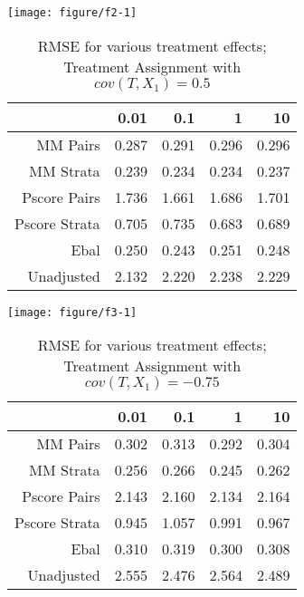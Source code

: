 \documentclass[11pt]{article}\usepackage[]{graphicx}\usepackage[]{color}
\makeatletter
\def\maxwidth{ %
  \ifdim\Gin@nat@width>\linewidth
    \linewidth
  \else
    \Gin@nat@width
  \fi
}
\newenvironment{knitrout}{}{} %
\makeatother
\begin{document}
\begin{knitrout}
\color{fgcolor}

{\centering \texttt{[image: figure/f2-1]} 

}



\end{knitrout}
\begin{table}[ht]
\centering
\begin{tabular}{rrrrr}
  \hline
 & 0.01 & 0.1 & 1 & 10 \\ 
  \hline
MM Pairs & 0.287 & 0.291 & 0.296 & 0.296 \\ 
  MM Strata & 0.239 & 0.234 & 0.234 & 0.237 \\ 
  Pscore Pairs & 1.736 & 1.661 & 1.686 & 1.701 \\ 
  Pscore Strata & 0.705 & 0.735 & 0.683 & 0.689 \\ 
  Ebal & 0.250 & 0.243 & 0.251 & 0.248 \\ 
  Unadjusted & 2.132 & 2.220 & 2.238 & 2.229 \\ 
   \hline
\end{tabular}
\caption{RMSE for various treatment effects; Treatment Assignment with $cov(T, X_1) = 0.5$} 
\label{tab:f2}
\end{table}



\begin{knitrout}
\color{fgcolor}

{\centering \texttt{[image: figure/f3-1]} 

}



\end{knitrout}
\begin{table}[ht]
\centering
\begin{tabular}{rrrrr}
  \hline
 & 0.01 & 0.1 & 1 & 10 \\ 
  \hline
MM Pairs & 0.302 & 0.313 & 0.292 & 0.304 \\ 
  MM Strata & 0.256 & 0.266 & 0.245 & 0.262 \\ 
  Pscore Pairs & 2.143 & 2.160 & 2.134 & 2.164 \\ 
  Pscore Strata & 0.945 & 1.057 & 0.991 & 0.967 \\ 
  Ebal & 0.310 & 0.319 & 0.300 & 0.308 \\ 
  Unadjusted & 2.555 & 2.476 & 2.564 & 2.489 \\ 
   \hline
\end{tabular}
\caption{RMSE for various treatment effects; Treatment Assignment with $cov(T, X_1) = -0.75$} 
\label{tab:f3}
\end{table}
\end{document}
